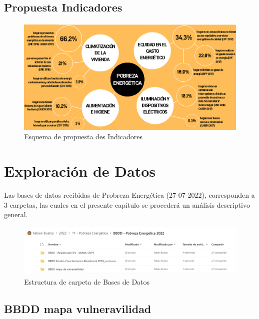 \documentclass[
]{book}
\begin{document}
\hypertarget{propuesta-indicadores}{%
\section{Propuesta Indicadores}\label{propuesta-indicadores}}

\begin{figure}

{\centering \includegraphics[width=1\linewidth]{images/esquema_indicadores} 

}

\caption{Esquema de propuesta des Indicadores}\label{fig:unnamed-chunk-8}
\end{figure}

\hypertarget{data_explorer}{%
\chapter{Exploración de Datos}\label{data_explorer}}

Las bases de datos recibidas de Probreza Energética (27-07-2022), corresponden a 3 carpetas, las cuales en el presente capítulo se procederá un análisis descriptivo general.

\begin{figure}
\centering
\includegraphics{images/bbdd_folders.png}
\caption{Estructura de carpeta de Bases de Datos}
\end{figure}

\hypertarget{bbdd-mapa-vulneravilidad}{%
\section{BBDD mapa vulneravilidad}\label{bbdd-mapa-vulneravilidad}}
\end{document}
